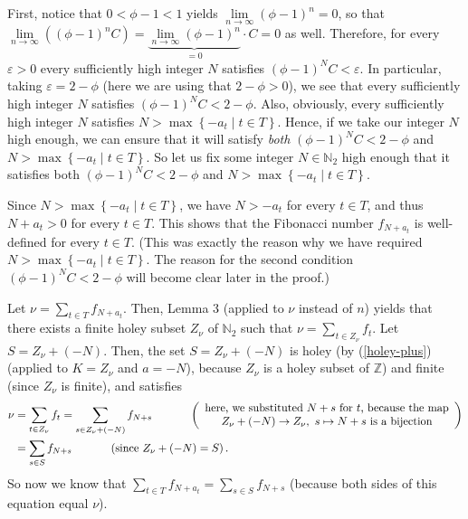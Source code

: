 \documentclass[12pt,final,notitlepage,onecolumn]{article}%
\begin{document}
First, notice that $0<\phi-1<1$ yields $\lim\limits_{n\rightarrow\infty
}\left(  \phi-1\right)  ^{n}=0$, so that $\lim\limits_{n\rightarrow\infty
}\left(  \left(  \phi-1\right)  ^{n}C\right)  =\underbrace{\lim
\limits_{n\rightarrow\infty}\left(  \phi-1\right)  ^{n}}_{=0}\cdot C=0$ as
well. Therefore, for every $\varepsilon>0$ every sufficiently high integer $N$
satisfies $\left(  \phi-1\right)  ^{N}C<\varepsilon$. In particular, taking
$\varepsilon=2-\phi$ (here we are using that $2-\phi>0$), we see that every
sufficiently high integer $N$ satisfies $\left(  \phi-1\right)  ^{N}C<2-\phi$.
Also, obviously, every sufficiently high integer $N$ satisfies $N>\max\left\{
-a_{t}\mid t\in T\right\}  $. Hence, if we take our integer $N$ high enough,
we can ensure that it will satisfy \textit{both} $\left(  \phi-1\right)
^{N}C<2-\phi$ and $N>\max\left\{  -a_{t}\mid t\in T\right\}  $. So let us fix
some integer $N\in\mathbb{N}_{2}$ high enough that it satisfies both $\left(
\phi-1\right)  ^{N}C<2-\phi$ and $N>\max\left\{  -a_{t}\mid t\in T\right\}  $.

Since $N>\max\left\{  -a_{t}\mid t\in T\right\}  $, we have $N>-a_{t}$ for
every $t\in T$, and thus $N+a_{t}>0$ for every $t\in T$. This shows that the
Fibonacci number $f_{N+a_{t}}$ is well-defined for every $t\in T$. (This was
exactly the reason why we have required $N>\max\left\{  -a_{t}\mid t\in
T\right\}  $. The reason for the second condition $\left(  \phi-1\right)
^{N}C<2-\phi$ will become clear later in the proof.)

Let $\nu=\sum\limits_{t\in T}f_{N+a_{t}}$. Then, Lemma 3 (applied to $\nu$
instead of $n$) yields that there exists a finite holey subset $Z_{\nu}$ of
$\mathbb{N}_{2}$ such that $\nu=\sum\limits_{t\in Z_{\nu}}f_{t}$. Let
$S=Z_{\nu}+\left(  -N\right)  $. Then, the set $S=Z_{\nu}+\left(  -N\right)  $
is holey (by (\ref{holey-plus}) (applied to $K=Z_{\nu}$ and $a=-N$), because
$Z_{\nu}$ is a holey subset of $\mathbb{Z}$) and finite (since $Z_{\nu}$ is
finite), and satisfies%
\begin{align*}
\nu &  =\sum\limits_{t\in Z_{\nu}}f_{t}=\sum\limits_{s\in Z_{\nu}+\left(
-N\right)  }f_{N+s}\ \ \ \ \ \ \ \ \ \ \left(
\begin{array}
[c]{c}%
\text{here, we substituted }N+s\text{ for }t\text{, because the map}\\
Z_{\nu}+\left(  -N\right)  \rightarrow Z_{\nu},\text{ }s\mapsto N+s\text{ is a
bijection}%
\end{array}
\right) \\
&  =\sum\limits_{s\in S}f_{N+s}\ \ \ \ \ \ \ \ \ \ \left(  \text{since }%
Z_{\nu}+\left(  -N\right)  =S\right)  .
\end{align*}
So now we know that $\sum\limits_{t\in T}f_{N+a_{t}}=\sum\limits_{s\in
S}f_{N+s}$ (because both sides of this equation equal $\nu$).
\end{document}
